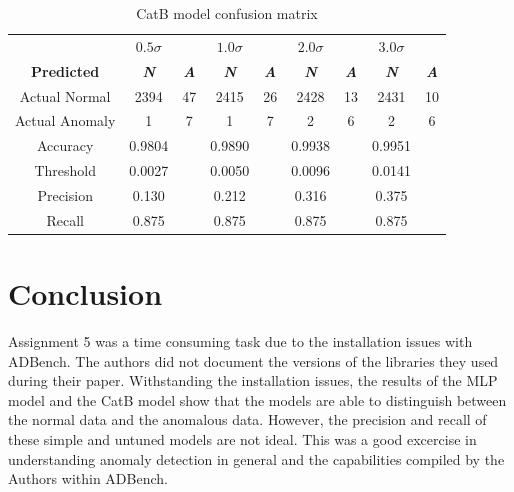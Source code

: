 \begin{table}[htbp]
    \caption{CatB model confusion matrix}\label{tab5}
    \begin{center}
        \begin{tabular}{c|cc|cc|cc|cc}
            \toprule 
                & $0.5\sigma$& &  $1.0\sigma$ & & $2.0\sigma$ & & $3.0\sigma$\\           
            \textbf{Predicted}  & \textbf{\textit{N}} & \textbf{\textit{A}}& \textbf{\textit{N}} & \textbf{\textit{A}}& \textbf{\textit{N}} & \textbf{\textit{A}}& \textbf{\textit{N}} & \textbf{\textit{A}}\\
            \midrule
            Actual Normal & 2394 & 47 & 2415 & 26 & 2428 & 13 & 2431 & 10\\
            Actual Anomaly & 1 & 7 & 1 & 7& 2 & 6 & 2 & 6\\
            \midrule
            Accuracy & 0.9804 & & 0.9890 & & 0.9938 & & 0.9951 & \\
            Threshold & 0.0027 & & 0.0050 & & 0.0096 & & 0.0141 & \\
            Precision & 0.130 & & 0.212 & & 0.316 & & 0.375 & \\
            Recall & 0.875 & & 0.875 & & 0.875 & & 0.875 & \\
            \bottomrule
        \end{tabular}
    \end{center}
\end{table}


\section{Conclusion}

Assignment 5 was a time consuming task due to the installation issues with ADBench. The authors did not document the versions of the libraries they used during their paper.
Withstanding the installation issues, the results of the MLP model and the CatB model show that the models are able to distinguish between the normal data and the anomalous data.
However, the precision and recall of these simple and untuned models are not ideal. This was a good excercise in understanding anomaly detection in general and the capabilities compiled by the Authors within ADBench.







